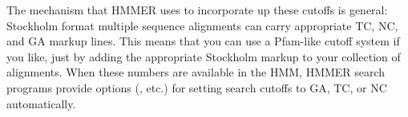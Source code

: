 The mechanism that HMMER uses to incorporate up these cutoffs is
general: Stockholm format multiple sequence alignments can carry
appropriate TC, NC, and GA markup lines. This means that you can use a
Pfam-like cutoff system if you like, just by adding the appropriate
Stockholm markup to your collection of alignments. When these numbers
are available in the HMM, HMMER search programs provide options
(, etc.) for setting search cutoffs to GA, TC, or NC
automatically.


